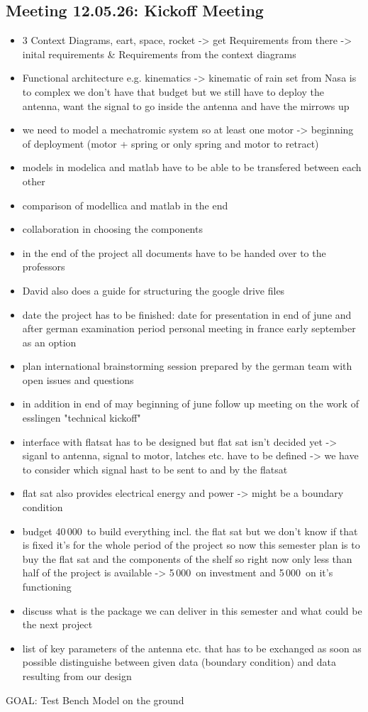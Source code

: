 	\subsection{Meeting 12.05.26: Kickoff Meeting }
	\begin{itemize}
		\item 3 Context Diagrams, eart, space, rocket -> get Requirements from there -> inital requirements \& Requirements from the context diagrams 
		\item Functional architecture e.g. kinematics -> kinematic of rain set from Nasa is to complex we don't have that budget but we still have to deploy the antenna, want the signal to go inside the antenna and have the mirrows up 
		\item we need to model a mechatromic system so at least one motor -> beginning of deployment (motor + spring or only spring and motor to retract)
		\item models in modelica and matlab have to be able to be transfered between each other 
		\item comparison of modellica and matlab in the end
		\item collaboration in choosing the components 
		\item in the end of the project all documents have to be handed over to the professors
		\item David also does a guide for structuring the google drive files 
		\item date the project has to be finished: date for presentation in end of june and after german examination period personal meeting in france  early september as an option
		\item plan international brainstorming session prepared by the german team with open issues and questions 
		\item in addition in end of may beginning of june follow up meeting on the work of esslingen "technical kickoff"
		\item interface with flatsat has to be designed but flat sat isn't decided yet -> siganl to antenna, signal to motor, latches etc. have to be defined -> we have to consider which signal hast to be sent to and by the flatsat
		\item flat sat also provides electrical energy and power -> might be a boundary condition
		\item budget 40\,000\,\texteuro{} to build everything incl. the flat sat but we don't know if that is fixed it's for the whole period of the project so now this semester plan is to buy the flat sat and the components of the shelf so right now only less than half of the project is available -> 5\,000\,\texteuro{} on investment and 5\,000\,\texteuro{} on it's functioning 
		\item discuss what is the package we can deliver in this semester and what could be the next project
		\item list of key parameters of the antenna etc. that has to be exchanged as soon as possible distinguishe between given data (boundary condition) and data resulting from our design
	\end{itemize}
	GOAL: Test Bench Model on the ground 

	
